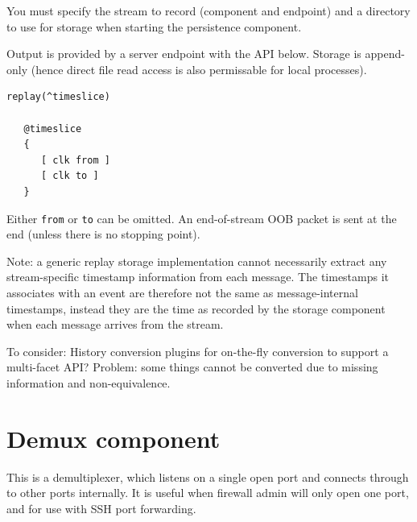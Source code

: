 \documentclass[12pt,a4paper,twoside]{article}
\renewcommand{\_}{\texttt{\symbol{95}}}
\begin{document}
You must specify the stream to record (component and endpoint) and a directory
to use for storage when starting the persistence component.

Output is provided by a server endpoint with the API below.
Storage is append-only (hence direct file read access is also permissable
for local processes).

\begin{verbatim}
replay(^timeslice)

   @timeslice
   {
      [ clk from ]
      [ clk to ]
   }
\end{verbatim}

Either \verb^from^ or \verb^to^ can be omitted. An end-of-stream
OOB packet is sent at the end (unless there is no stopping point).

Note: a generic replay storage implementation cannot necessarily
extract any stream-specific timestamp information from each message.
The timestamps it associates with an event are therefore not the
same as message-internal timestamps, instead they are the time
as recorded by the storage component when each message arrives
from the stream.

To consider: History conversion plugins for on-the-fly conversion to
support a multi-facet API? Problem: some things cannot be converted due
to missing information and non-equivalence.

\section{Demux component}

This is a demultiplexer, which listens on a single open port and connects
through to other ports internally.
It is useful when firewall admin will only open one port, and for use with
SSH port forwarding.
\end{document}
